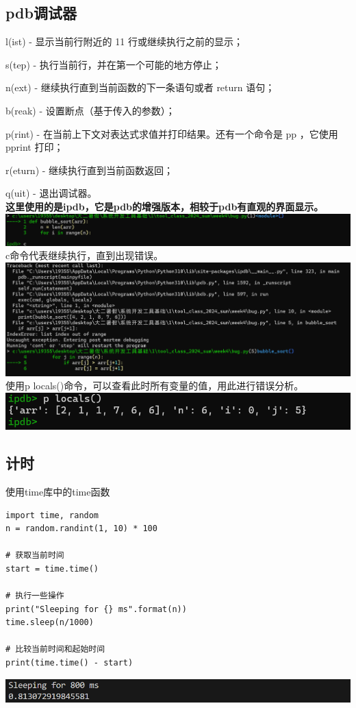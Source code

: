 \documentclass[UTF8,a4paper]{ctexart}
\begin{document}
\subsection{pdb调试器}
l(ist) - 显示当前行附近的 11 行或继续执行之前的显示；\par
s(tep) - 执行当前行，并在第一个可能的地方停止；\par
n(ext) - 继续执行直到当前函数的下一条语句或者 return 语句；\par
b(reak) - 设置断点（基于传入的参数）；\par
p(rint) - 在当前上下文对表达式求值并打印结果。还有一个命令是 pp ，它使用 pprint 打印；\par
r(eturn) - 继续执行直到当前函数返回；\par
q(uit) - 退出调试器。\\
\textbf{这里使用的是ipdb，它是pdb的增强版本，相较于pdb有直观的界面显示。}\\
\includegraphics[width=1\textwidth]{./pictures/bug1.png}
c命令代表继续执行，直到出现错误。\\
\includegraphics[width=1\textwidth]{./pictures/bug2.png}
使用p locals()命令，可以查看此时所有变量的值，用此进行错误分析。\\
\includegraphics[width=1\textwidth]{./pictures/bug3.png}
\subsection{计时}
使用time库中的time函数
\begin{lstlisting}
import time, random
n = random.randint(1, 10) * 100

# 获取当前时间 
start = time.time()

# 执行一些操作
print("Sleeping for {} ms".format(n))
time.sleep(n/1000)

# 比较当前时间和起始时间
print(time.time() - start)

\end{lstlisting}
\includegraphics[width=1\textwidth]{./pictures/time.png}
\end{document}
